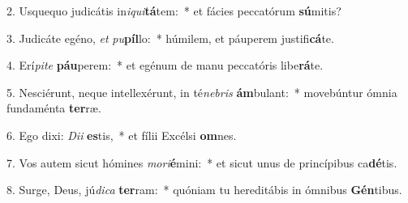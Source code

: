 2. Usquequo judicátis in\textit{i}\textit{qui}\textbf{tá}tem:~*  et fácies peccatórum \textbf{sú}mitis?\

3. Judicáte egéno, \textit{et} \textit{pu}\textbf{píl}lo:~*  húmilem, et páuperem justifi\textbf{cá}te.\

4. Erí\textit{pi}\textit{te} \textbf{páu}perem:~*  et egénum de manu peccatóris libe\textbf{rá}te.\

5. Nesciérunt, neque intellexérunt, in té\textit{ne}\textit{bris} \textbf{ám}bulant:~*  movebúntur ómnia fundaménta \textbf{ter}ræ.\

6. Ego dixi: \textit{Di}\textit{i} \textbf{es}tis,~*  et fílii Excélsi \textbf{om}nes.\

7. Vos autem sicut hómines \textit{mo}\textit{ri}\textbf{é}mini:~*  et sicut unus de princípibus ca\textbf{dé}tis.\

8. Surge, Deus, jú\textit{di}\textit{ca} \textbf{ter}ram:~*  quóniam tu hereditábis in ómnibus \textbf{Gén}tibus.\

